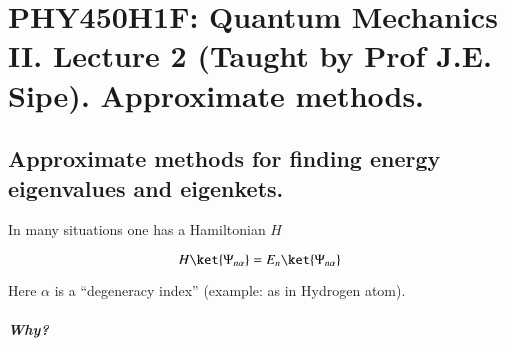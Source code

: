 %
%

\chapter{PHY450H1F: Quantum Mechanics II.  Lecture 2 (Taught by Prof J.E. Sipe).  Approximate methods.}
\label{chap:qmTwoL2}
{}
\date{Sept 12, 2011}

\beginArtWithToc

\section{Approximate methods for finding energy eigenvalues and eigenkets.}

In many situations one has a Hamiltonian $H$

\begin{equation}\label{eqn:qmTwoL2:10}
H \ket{\Psi_{n \alpha}} = E_n \ket{\Psi_{n \alpha}}
\end{equation}

Here $\alpha$ is a ``degeneracy index'' (example: as in Hydrogen atom).

\paragraph{Why?}

